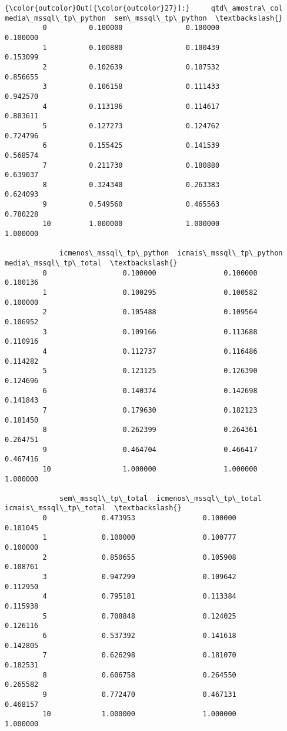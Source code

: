 \documentclass[11pt]{article}
\begin{document}
\begin{Verbatim}[commandchars=\\\{\}]
{\color{outcolor}Out[{\color{outcolor}27}]:}     qtd\_amostra\_col  media\_mssql\_tp\_python  sem\_mssql\_tp\_python  \textbackslash{}
         0          0.100000               0.100000             0.100000   
         1          0.100880               0.100439             0.153099   
         2          0.102639               0.107532             0.856655   
         3          0.106158               0.111433             0.942570   
         4          0.113196               0.114617             0.803611   
         5          0.127273               0.124762             0.724796   
         6          0.155425               0.141539             0.568574   
         7          0.211730               0.180880             0.639037   
         8          0.324340               0.263383             0.624093   
         9          0.549560               0.465563             0.780228   
         10         1.000000               1.000000             1.000000   
         
             icmenos\_mssql\_tp\_python  icmais\_mssql\_tp\_python  media\_mssql\_tp\_total  \textbackslash{}
         0                  0.100000                0.100000              0.100136   
         1                  0.100295                0.100582              0.100000   
         2                  0.105488                0.109564              0.106952   
         3                  0.109166                0.113688              0.110916   
         4                  0.112737                0.116486              0.114282   
         5                  0.123125                0.126390              0.124696   
         6                  0.140374                0.142698              0.141843   
         7                  0.179630                0.182123              0.181450   
         8                  0.262399                0.264361              0.264751   
         9                  0.464704                0.466417              0.467416   
         10                 1.000000                1.000000              1.000000   
         
             sem\_mssql\_tp\_total  icmenos\_mssql\_tp\_total  icmais\_mssql\_tp\_total  \textbackslash{}
         0             0.473953                0.100000               0.101045   
         1             0.100000                0.100777               0.100000   
         2             0.850655                0.105908               0.108761   
         3             0.947299                0.109642               0.112950   
         4             0.795181                0.113384               0.115938   
         5             0.708848                0.124025               0.126116   
         6             0.537392                0.141618               0.142805   
         7             0.626298                0.181070               0.182531   
         8             0.606758                0.264550               0.265582   
         9             0.772470                0.467131               0.468157   
         10            1.000000                1.000000               1.000000   
         

\end{Verbatim}
\end{document}

